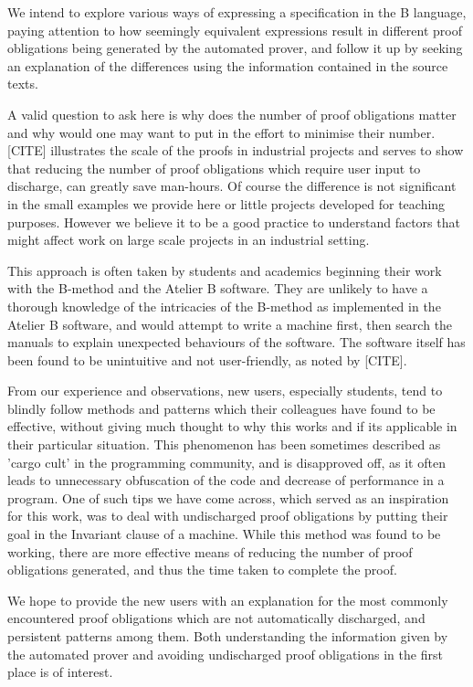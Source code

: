 \documentclass[11pt,journal]{IEEEtran}
\begin{document}
	We intend to explore various ways of expressing a specification in the B language, paying attention to how seemingly equivalent expressions result in different proof obligations being generated by the automated prover, and follow it up by seeking an explanation of the differences using the information contained in the source texts. 
	
	A valid question to ask here is why does the number of proof obligations matter and why would one may want to put in the effort to minimise their number. [CITE] illustrates the scale of the proofs in industrial projects and serves to show that reducing the number of proof obligations which require user input to discharge, can greatly save man-hours. Of course the difference is not significant in the small examples we provide here or little projects developed for teaching purposes. However we believe it to be a good practice to understand factors that might affect work on large scale projects in an industrial setting.
	
	This approach is often taken by students and academics beginning their work with the B-method and the Atelier B software. They are unlikely to have a thorough knowledge of the intricacies of the B-method as implemented in the Atelier B software, and would attempt to write a machine first, then search the manuals to explain unexpected behaviours of the software. The software itself has been found to be unintuitive and not user-friendly, as noted by [CITE].
	
	From our experience and observations, new users, especially students, tend to blindly follow methods and patterns which their colleagues have found to be effective, without giving much thought to why this works and if its applicable in their particular situation. This phenomenon has been sometimes described as 'cargo cult' in the programming community\cite{Cargo culting}, and is disapproved off, as it often leads to unnecessary obfuscation of the code and decrease of performance in a program. One of such tips we have come across, which served as an inspiration for this work, was to deal with undischarged proof obligations by putting their goal in the Invariant clause of a machine. While this method was found to be working, there are more effective means of reducing the number of proof obligations generated, and thus the time taken to complete the proof.
	
	We hope to provide the new users with an explanation for the most commonly encountered proof obligations which are not automatically discharged, and persistent patterns among them. Both understanding the information given by the automated prover and avoiding undischarged proof obligations in the first place is of interest.
	
\end{document}

